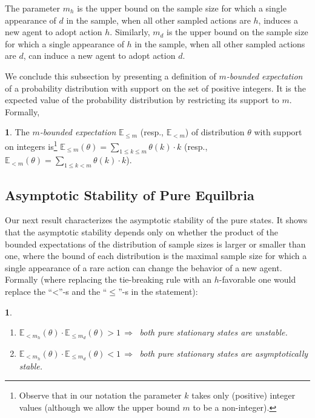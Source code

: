 \documentclass[12pt]{article}
\numberwithin{equation}{section}
\numberwithin{figure}{section}
\theoremstyle{definition}
\newtheorem{defn}{\protect\definitionname}
\theoremstyle{plain}
\theoremstyle{plain}
\newtheorem{prop}{\protect\propositionname}
\theoremstyle{plain}
\theoremstyle{remark}
\theoremstyle{plain}
\theoremstyle{plain}
\providecommand{\definitionname}{Definition}
\providecommand{\propositionname}{Proposition}
\begin{document}
    The parameter $m_{h}$ is the 
    upper bound on the sample size for which
a single appearance of $d$ in the sample, when all other sampled actions are $h$, induces a new agent to adopt action $h$. Similarly,  $m_{d}$ is the 
upper bound on the sample size for which a single appearance of $h$ in the sample, when all other sampled actions are $d$, can induce a new agent to adopt action $d$. 
 
We conclude this subsection by presenting a definition of $m$\emph{-bounded expectation} of a probability distribution with support on the set of positive integers. It is the expected value of
the probability distribution by restricting its support to $m.$ Formally,

\begin{defn}
The $m$\emph{-bounded expectation} $\mathbb{E}_{\leq m}$ (resp., $\mathbb{E}_{< m}$) of distribution $\theta$ with support on
integers is\footnote{
Observe that in our notation the parameter $k$ takes only (positive) integer values (although we allow the upper bound $m$ to be a non-integer).}
$\mathbb{E}_{\leq m}\left(\theta\right)=\sum_{1 \leq k\leq m}\theta\left(k\right)\cdot k$ (resp., $\mathbb{E}_{< m}\left(\theta\right)=\sum_{1\leq k< m}\theta\left(k\right)\cdot k$).
\end{defn}
\subsection{Asymptotic Stability of Pure Equilbria}
Our next result characterizes the asymptotic stability of the pure
states. It shows that the asymptotic stability depends only on whether the product of the bounded expectations of the distribution of sample sizes is larger or smaller than one, where the bound of each distribution is the maximal sample size for which a single appearance of a rare action can change the behavior of a new agent. Formally 
(where replacing the tie-breaking rule with an $h$-favorable one would replace the ``<''-s and the ``$\leq$''-s in the statement):
\begin{prop}
\label{prop:pure-equilbiria-satbility}
\begin{enumerate}
\item $\mathbb{E}_{< m_{h}}\left(\theta\right)\cdot \mathbb{E}_{\leq m_{d}}\left(\theta\right)>1\,\Rightarrow\,$ both pure stationary states are unstable.
\item $\mathbb{E}_{<m_{h}}\left(\theta\right)\cdot \mathbb{E}_{\leq m_{d}}\left(\theta\right)<1\,\Rightarrow\,$ both pure stationary states are asymptotically stable. 
\end{enumerate}
\end{prop}
\end{document}
